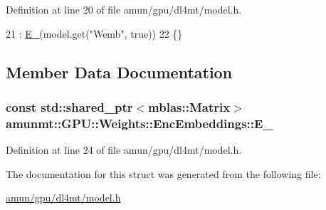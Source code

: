 Definition at line 20 of file amun/gpu/dl4mt/model.\+h.


\begin{DoxyCode}
21     : \hyperlink{structamunmt_1_1GPU_1_1Weights_1_1EncEmbeddings_a539a4f5c1750e223a03e38a2e6e5e62c}{E\_}(model.get(\textcolor{stringliteral}{"Wemb"}, \textcolor{keyword}{true}))
22     \{\}
\end{DoxyCode}


\subsection{Member Data Documentation}
\subsubsection[{\texorpdfstring{E\+\_\+}{E_}}]{\setlength{\rightskip}{0pt plus 5cm}const std\+::shared\+\_\+ptr$<${\bf mblas\+::\+Matrix}$>$ amunmt\+::\+G\+P\+U\+::\+Weights\+::\+Enc\+Embeddings\+::\+E\+\_\+}\hypertarget{structamunmt_1_1GPU_1_1Weights_1_1EncEmbeddings_a539a4f5c1750e223a03e38a2e6e5e62c}{}\label{structamunmt_1_1GPU_1_1Weights_1_1EncEmbeddings_a539a4f5c1750e223a03e38a2e6e5e62c}


Definition at line 24 of file amun/gpu/dl4mt/model.\+h.



The documentation for this struct was generated from the following file\+:\begin{DoxyCompactItemize}
\item 
\hyperlink{amun_2gpu_2dl4mt_2model_8h}{amun/gpu/dl4mt/model.\+h}\end{DoxyCompactItemize}
